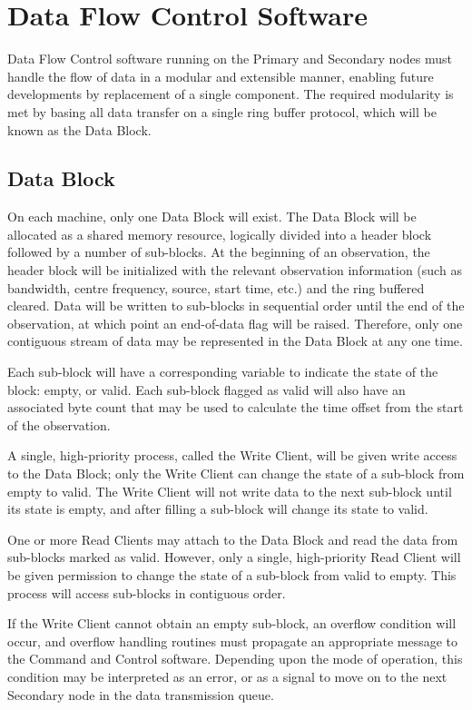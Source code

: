 \chapter{Data Flow Control Software}

Data Flow Control software running on the Primary and Secondary nodes
must handle the flow of data in a modular and extensible manner,
enabling future developments by replacement of a single component.
The required modularity is met by basing all data transfer on a single
ring buffer protocol, which will be known as the Data Block.

\section{Data Block}
\label{sec:data_block}

On each machine, only one Data Block will exist.  The Data Block will
be allocated as a shared memory resource, logically divided into a
header block followed by a number of sub-blocks.  At the beginning of
an observation, the header block will be initialized with the relevant
observation information (such as bandwidth, centre frequency, source,
start time, etc.) and the ring buffered cleared.  Data will be written
to sub-blocks in sequential order until the end of the observation, at
which point an end-of-data flag will be raised.  Therefore, only one
contiguous stream of data may be represented in the Data Block at any
one time.

Each sub-block will have a corresponding variable to indicate the
state of the block: empty, or valid.  Each sub-block flagged as valid
will also have an associated byte count that may be used to calculate
the time offset from the start of the observation.

A single, high-priority process, called the Write Client, will be
given write access to the Data Block; only the Write Client can change
the state of a sub-block from empty to valid.  The Write Client will
not write data to the next sub-block until its state is empty, and
after filling a sub-block will change its state to valid.

One or more Read Clients may attach to the Data Block and read the
data from sub-blocks marked as valid.  However, only a single,
high-priority Read Client will be given permission to change the state
of a sub-block from valid to empty.  This process will access
sub-blocks in contiguous order.

If the Write Client cannot obtain an empty sub-block, an overflow
condition will occur, and overflow handling routines must propagate an
appropriate message to the Command and Control software.  Depending
upon the mode of operation, this condition may be interpreted as an
error, or as a signal to move on to the next Secondary node in the
data transmission queue.


